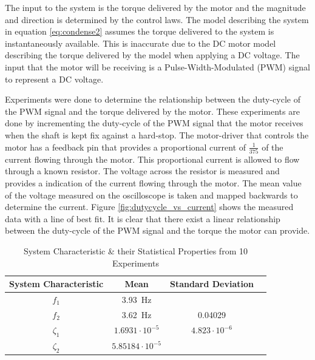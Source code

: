 \documentclass[a4paper,12pt]{article}
\begin{document}
	The input to the system is the torque delivered by the motor and the magnitude and direction is determined by the control laws. The model describing the system in equation \ref{eq:condense2} assumes the torque delivered to the system is instantaneously available. This is inaccurate due to the DC motor model describing the torque delivered by the model when applying a DC voltage. The input that the motor will be receiving is a Pulse-Width-Modulated (PWM) signal to represent a DC voltage.
	
	Experiments were done to determine the relationship between the duty-cycle of the PWM signal and the torque delivered by the motor. These experiments are done by incrementing the duty-cycle of the PWM signal that the motor receives when the shaft is kept fix against a hard-stop. The motor-driver that controls the motor has a feedback pin that provides a proportional current of $\frac{1}{375}$ of the current flowing through the motor. This proportional current is allowed to flow through a known resistor. The voltage across the resistor is measured and provides a indication of the current flowing through the motor. The mean value of the voltage measured on the oscilloscope is taken and mapped backwards to determine the current. Figure \ref{fig:dutycycle_vs_current} shows the measured data with a line of best fit. It is clear that there exist a linear relationship between the duty-cycle of the PWM signal and the torque the motor can provide.
	
	\begin{table}[]
		\centering
		\begin{tabular}{|c|c|c|c|}
			\hline
			 System Characteristic & Mean & Standard Deviation\\
			\hline
			\hline
			$f_{1}$ & \SI{3.93}{Hz} &  \\
			\hline
			$f_{2}$ & \SI{3.62}{Hz} & 0.04029 \\ 
			\hline
			$\zeta_{1}$ & $1.6931 \cdot10^{-5}$ & $4.823\cdot 10^{-6}$
			 \\
			\hline
 			$\zeta_{2}$ & $5.85184 \cdot 10^{-5}$ & \\
 			\hline
	\end{tabular}
	\caption{System Characteristic \& their Statistical Properties from 10 Experiments}
	\label{table:system_characteristic}
	\end{table}
\end{document}
